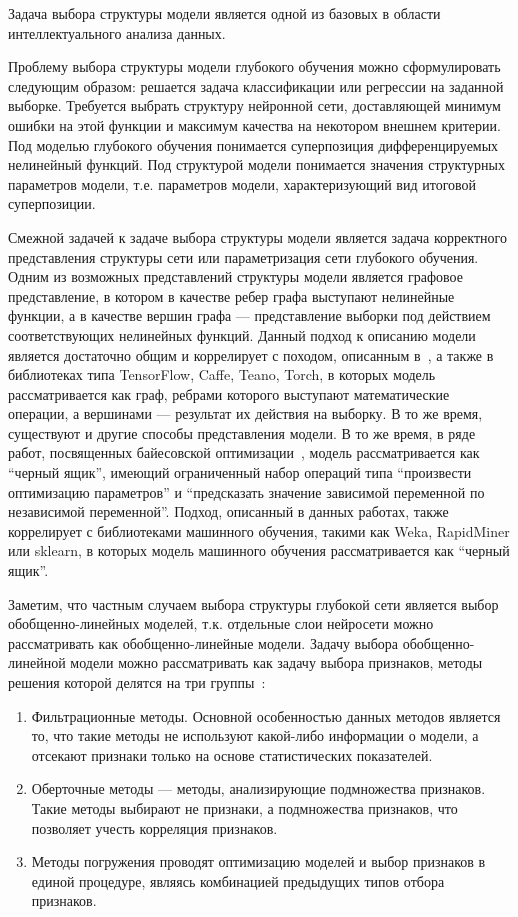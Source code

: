 \documentclass{article}
\begin{document}
Задача выбора структуры модели является одной из базовых в области интеллектуального анализа данных.

Проблему выбора структуры модели глубокого обучения можно сформулировать следующим образом: решается задача классификации или регрессии на заданной выборке. Требуется выбрать структуру нейронной сети, доставляющей минимум ошибки на этой функции и максимум качества на некотором внешнем критерии. Под моделью глубокого обучения понимается суперпозиция дифференцируемых нелинейный функций. Под структурой модели понимается значения структурных параметров модели, т.е. параметров модели, характеризующий вид итоговой суперпозиции. 



Смежной задачей к задаче выбора структуры модели является задача корректного представления структуры сети или параметризация сети глубокого обучения. Одним из возможных представлений структуры модели является графовое представление, в котором в качестве ребер графа выступают нелинейные функции, а в качестве вершин графа --- представление выборки под действием соответствующих нелинейных функций. 
Данный подход к описанию модели является достаточно общим и коррелирует с походом, описанным в~\cite{vokov}, а также в библиотеках типа TensorFlow, Caffe, Teano, Torch, в которых модель рассматривается как граф, ребрами которого выступают математические операции, а вершинами --- результат их действия на выборку. 
 В то же время, существуют и другие способы представления модели. В то же время, в ряде работ, посвященных байесовской оптимизации~\cite{snoek_deep,rbf_surrogate,bo_gp}, модель рассматривается как ``черный ящик'', имеющий ограниченный набор операций типа ``произвести оптимизацию параметров'' и ``предсказать значение зависимой переменной по независимой переменной''.
Подход, описанный в данных работах, также коррелирует с  библиотеками машинного обучения, такими как Weka, RapidMiner или sklearn, в которых модель машинного обучения рассматривается как ``черный ящик''.


Заметим, что частным случаем выбора структуры глубокой сети является выбор обобщенно-линейных моделей, т.к. отдельные слои нейросети можно рассматривать как обобщенно-линейные модели. Задачу выбора обобщенно-линейной модели можно рассматривать как задачу выбора признаков, методы решения которой делятся на три группы~\cite{feature_select}:
\begin{enumerate}
\item Фильтрационные методы. Основной особенностью данных методов является то, что такие методы не используют какой-либо информации о модели, а отсекают признаки только на основе статистических показателей. 
\item Оберточные методы --- методы, анализирующие подмножества признаков. Такие методы выбирают не признаки, а подмножества признаков, что позволяет учесть корреляция признаков.
\item Методы погружения проводят оптимизацию моделей и выбор признаков в единой процедуре, являясь комбинацией предыдущих типов отбора признаков.
\end{enumerate} 
\end{document}
